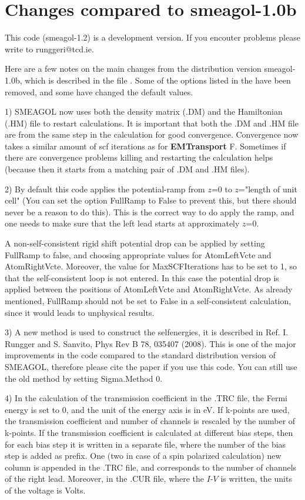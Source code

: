 \documentclass[11pt]{article}
\begin{document}
{\section{Changes compared to smeagol-1.0b}

This code (smeagol-1.2) is a development version. If you encouter
problems please write to runggeri@tcd.ie.

Here are a few notes on the main changes from the distribution version smeagol-1.0b, which is described in the file . Some of the options listed in the  have been removed, and some have changed the default values. 


1) SMEAGOL now uses both the density matrix (.DM) and the Hamiltonian (.HM)
file to restart calculations. It is important that both the .DM and .HM file
are from the same step in the calculation for good convergence. Convergence now takes a similar amount of scf iterations as for {\bf EMTransport} F. Sometimes if there are convergence problems killing
and restarting the calculation helps (because then it starts from a matching
pair of .DM and .HM files).

2) By default this code applies the potential-ramp from $z$=0 to $z$="length of unit cell" (You can set the option FullRamp to False to prevent this, but
there should never be a reason to do this). This is the correct way to do
apply the ramp, and one needs to make sure that the left lead starts at approximately $z$=0.

A non-self-consistent rigid shift potential drop can be applied by setting
FullRamp to false, and choosing appropriate values for AtomLeftVcte and AtomRightVcte.
Moreover, the value for MaxSCFIterations has to be set to 1, so that the
self-consistent loop is not entered. In this case the potential drop is
applied between the positions of AtomLeftVcte and AtomRightVcte. As already
mentioned, FullRamp should not be set to False in a self-consistent
calculation, since it would leads to unphysical results.

3) A new method is used to construct the selfenergies, it is described in Ref.  I. Rungger and S. Sanvito, Phys Rev B 78, 035407 (2008).  This is one of the major improvements in the code compared to the standard distribution version of SMEAGOL, therefore please cite the paper if you use this code. You can still use the old method by setting Sigma.Method 0.

4) In the calculation of the transmission coefficient in the .TRC file, the
Fermi energy is set to 0, and the unit of the energy axis is in eV. If
k-points are used, the transmission coefficient and number of channels is
rescaled by the number of k-points. If the transmission coefficient is
calculated at different bias steps, then for each bias step it is written in a
separate file, where the number of the bias step is added as prefix. One (two
in case of a spin polarized calculation) new column is appended in the .TRC
file, and corresponds to the number of channels of the right lead. Moreover,
in the .CUR file, where the $I$-$V$ is written, the units of the voltage is Volts.

}
\end{document}
